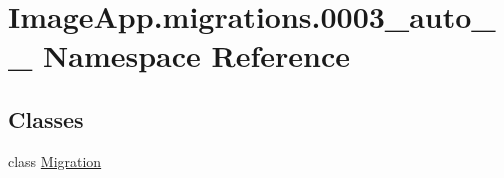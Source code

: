\hypertarget{namespace_image_app_1_1migrations_1_10003__auto__20180818__1425}{}\section{Image\+App.\+migrations.0003\+\_\+auto\+\_\+\_ Namespace Reference}
\label{namespace_image_app_1_1migrations_1_10003__auto__20180818__1425}
\subsection*{Classes}
\begin{DoxyCompactItemize}
\item 
class \mbox{\hyperlink{class_image_app_1_1migrations_1_10003__auto__20180818__1425_1_1_migration}{Migration}}
\end{DoxyCompactItemize}
